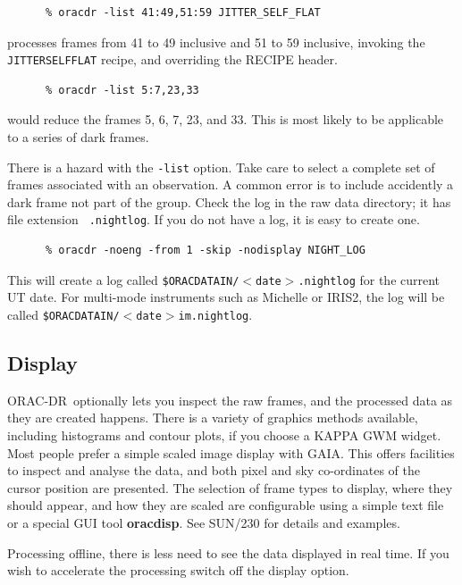\documentclass[twoside,11pt]{article}
\newcommand{\xref}[3]{#1}
\newcommand{\xlabel}[1]{}
\renewcommand{\_}{\texttt{\symbol{95}}}
\newcommand{\GAIA}{{\footnotesize GAIA}}
\newcommand{\KAPPA}{{\footnotesize KAPPA}}
\newcommand{\ORACDR}{{\footnotesize ORAC-DR}}
\begin{document}
\begin{verbatim}
      % oracdr -list 41:49,51:59 JITTER_SELF_FLAT
\end{verbatim}
processes frames from 41 to 49 inclusive and 51 to 59 inclusive,
invoking the {\tt JITTER\_SELF\_FLAT} recipe, and overriding
the RECIPE header.

\begin{verbatim}
      % oracdr -list 5:7,23,33
\end{verbatim}
would reduce the frames 5, 6, 7, 23, and 33.  This is most likely
to be applicable to a series of dark frames.

There is a hazard with the {\tt -list} option.  Take care to select a
complete set of frames associated with an observation.  A common error
is to include accidently a dark frame not part of the group.  Check
the log in the raw data directory; it has file extension {\tt
.nightlog}.  If you do not have a log, it is easy to create one.

\begin{verbatim}
      % oracdr -noeng -from 1 -skip -nodisplay NIGHT_LOG
\end{verbatim}
This will create a log called {\tt \$ORAC\_DATA\_IN/$<$date$>$.nightlog}
for the current UT date. For multi-mode instruments such as Michelle or
IRIS2, the log will be called {\tt \$ORAC\_DATA\_IN/$<$date$>$\_im.nightlog}.

\subsection{\xlabel{display}Display\label{display}}

\ORACDR\ optionally lets you inspect the raw frames, and the processed
data as they are created happens.  There is a variety of graphics
methods available, including histograms and contour plots, if you
choose a \xref{\KAPPA}{sun95}{} GWM widget.  Most people prefer a
simple scaled image display with \xref{\GAIA}{sun214}{}.  This offers
facilities to inspect and analyse the data, and both pixel and sky
co-ordinates of the cursor position are presented.  The selection of
frame types to display, where they should appear, and how they are
scaled are configurable using a simple text file or a special GUI tool
{\bf oracdisp}.  See \xref{SUN/230}{sun230}{display_system} for details
and examples.

Processing offline, there is less need to see the data displayed in real time.
If you wish to accelerate the processing switch off the display option.
\end{document}
